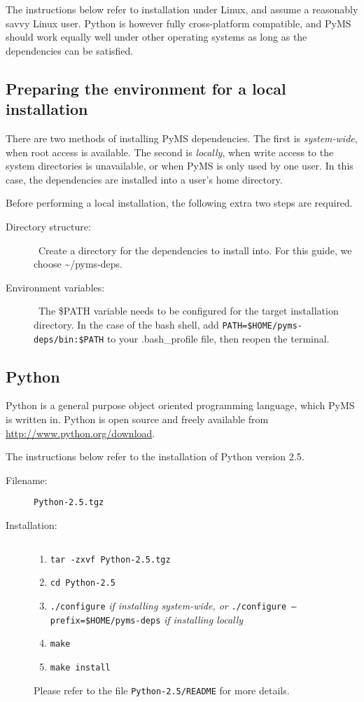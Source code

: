 The instructions below refer to installation under Linux, and assume
a reasonably savvy Linux user.  Python is however fully cross-platform
compatible, and PyMS should work equally well under other operating
systems as long as the dependencies can be satisfied.

\subsection{Preparing the environment for a local installation}

There are two methods of installing PyMS dependencies. The first is
{\it system-wide}, when root access is available. The second is {\it locally},
when write access to the system directories is unavailable, or when PyMS is
only used by one user. In this case, the dependencies are installed into a
user's home directory.

Before performing a local installation, the following extra two steps are
required.

\begin{description}
  \item [Directory structure:] \
        Create a directory for the dependencies to install into. For this
        guide, we choose \~{}/pyms-deps.
  \item [Environment variables:] \
        The \$PATH variable needs to be configured for the target installation
        directory. In the case of the bash shell, add
        {\tt PATH=\$HOME/pyms-deps/bin:\$PATH} to your .bash\_profile file,
        then reopen the terminal.
\end{description}

\subsection{Python}

Python is a general purpose object oriented programming language, which
PyMS is written in.  Python is open source and freely available
from \url{http://www.python.org/download}.

The instructions below refer to the installation of Python version
2.5.

\begin{description}
\item [Filename:] {\tt Python-2.5.tgz}
\item [Installation:] $ $
  \begin{enumerate}
  \item {\tt tar -zxvf Python-2.5.tgz}
  \item {\tt cd Python-2.5}
  \item {\tt ./configure} {\it if installing system-wide, or}\newline
        {\tt ./configure --prefix=\$HOME/pyms-deps} {\it if installing locally}
  \item {\tt make}
  \item {\tt make install}
  \end{enumerate}
Please refer to the file {\tt Python-2.5/README} for more details.
\end{description}

